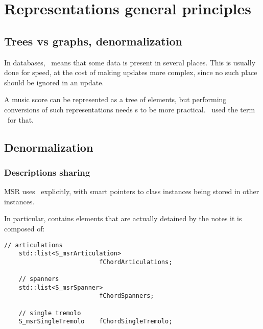
\chapter{Representations general principles}\label{Representations general principles}


\section{Trees vs graphs, denormalization}

In databases, \denorm\ means that some data is present in several places. This is usually done for speed, at the cost of making updates more complex, since no such place should be ignored in an update.

A music score can be represented as a tree of elements, but performing conversions of such representations needs s to be more practical. \mf\ used the term \link\ for that.


\section{Denormalization}


\subsection{Descriptions sharing}

MSR uses \denorm\ explicitly, with smart pointers to class instances being stored in other instances.

In particular,  contains elements that are actually detained by the notes it is composed of:
\begin{lstlisting}[language=CPlusPlus]
    // articulations
    std::list<S_msrArticulation>
                          fChordArticulations;

    // spanners
    std::list<S_msrSpanner>
                          fChordSpanners;

    // single tremolo
    S_msrSingleTremolo    fChordSingleTremolo;
\end{lstlisting}

